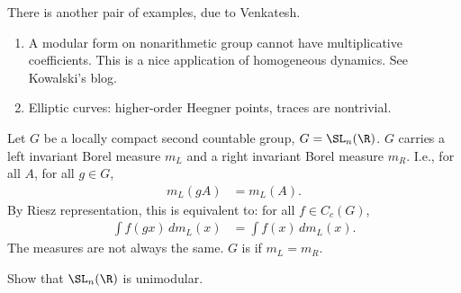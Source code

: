 There is another pair of examples, due to Venkatesh.
\begin{enumerate}
\item
A modular form on nonarithmetic group cannot have multiplicative coefficients. This is a nice application of homogeneous dynamics. See Kowalski's blog.
\item Elliptic curves: higher-order Heegner points, traces are nontrivial.
\end{enumerate}
Let $G$ be a locally compact second countable group, $G=\SL_n(\R)$. $G$ carries a left invariant Borel measure $m_L$ and a right invariant Borel measure $m_R$. I.e., for all $A$, for all $g\in G$, 
\begin{align}
m_L(gA)&=m_L(A).
\end{align}
By Riesz representation, this is equivalent to: for all $f\in C_c(G)$, 
\begin{align}
\int f(gx) \, dm_L(x) &= \int f(x) \, dm_L(x).
\end{align}
The measures are not always the same. $G$ is  if $m_L=m_R$.
\begin{exr}
Show that $\SL_n(\R)$ is unimodular.
\end{exr}